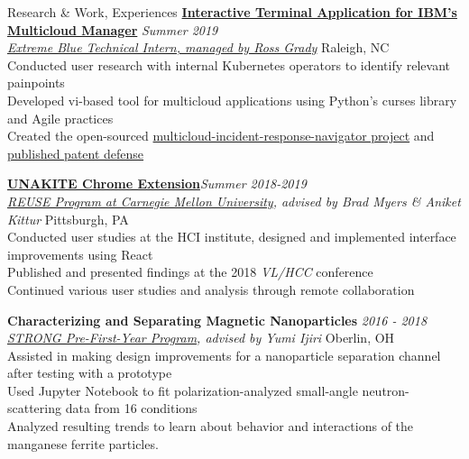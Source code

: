 \documentclass{resume}
\begin{document}
\begin{rSection}{Research \& Work, Experiences}
\href{https://github.com/IBM/multicloud-incident-response-navigator}{\bf Interactive Terminal Application for IBM's Multicloud Manager} \hfill  {\em Summer 2019} \\
\href{https://www.ibm.com/employment/extremeblue/index.html}{\em Extreme Blue Technical Intern, managed by Ross Grady} \hfill { Raleigh, NC} \\
{Conducted user research with internal Kubernetes operators to identify relevant painpoints} \\
Developed vi-based tool for multicloud applications using Python's curses library and Agile practices \\
{Created the open-sourced \href{https://github.com/IBM/multicloud-incident-response-navigator}{multicloud-incident-response-navigator project}} and \href{https://priorart.ip.com/IPCOM/000262660}{published patent defense}

{\bf \href{https://unakite.info/}{UNAKITE Chrome Extension}}\hfill {\em Summer 2018-2019} \\
{\em \href{https://www.cmu.edu/scs/isr/reuse/}{REUSE Program at Carnegie Mellon University}, advised by Brad Myers \& Aniket Kittur} \hfill { Pittsburgh, PA}\\
Conducted user studies at the HCI institute, designed and implemented interface improvements using React \\
Published and presented findings at the 2018 {\em VL/HCC} conference \\
Continued various user studies and analysis through remote collaboration

{\bf Characterizing and Separating Magnetic Nanoparticles } \hfill {\em 2016 - 2018}\\
{\em \href{https://www.oberlin.edu/undergraduate-research/programs/strong}{STRONG Pre-First-Year Program}, advised by Yumi Ijiri } \hfill { Oberlin, OH}\\
Assisted in making design improvements for a nanoparticle separation channel after testing with a prototype \\
Used Jupyter Notebook to fit polarization-analyzed small-angle neutron-scattering data from 16 conditions \\
Analyzed resulting trends to learn about behavior and interactions of the manganese ferrite particles.

\end{rSection}
\end{document}
